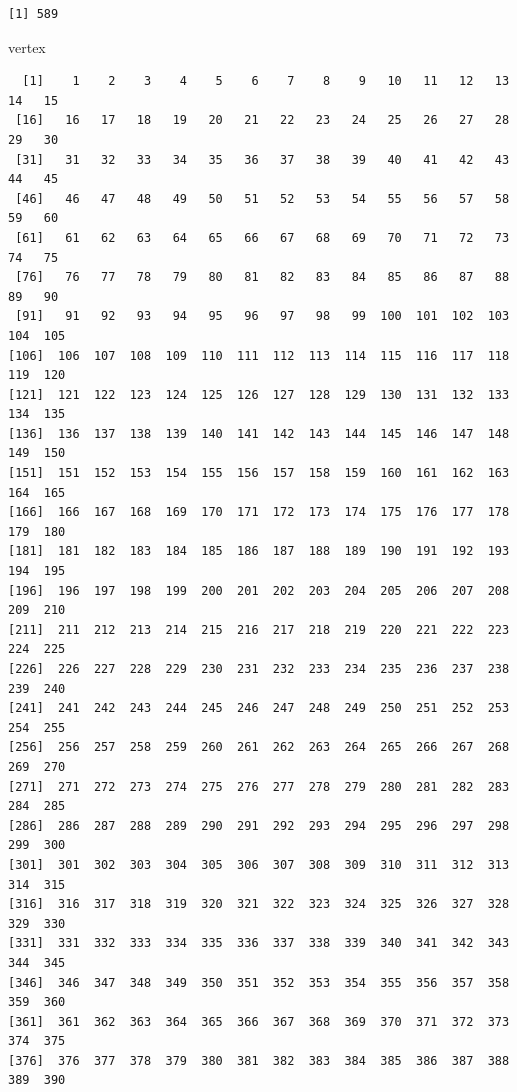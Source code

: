 \documentclass[
  letterpaper,
  DIV=11,
  numbers=noendperiod]{scrreprt}
\newenvironment{Shaded}{\begin{snugshade}}{\end{snugshade}}
\newcommand{\NormalTok}[1]{\textcolor[rgb]{0.00,0.23,0.31}{#1}}
\begin{document}
\begin{verbatim}
[1] 589
\end{verbatim}

\begin{Shaded}
\begin{Highlighting}[]
\NormalTok{vertex}
\end{Highlighting}
\end{Shaded}

\begin{verbatim}
  [1]    1    2    3    4    5    6    7    8    9   10   11   12   13   14   15
 [16]   16   17   18   19   20   21   22   23   24   25   26   27   28   29   30
 [31]   31   32   33   34   35   36   37   38   39   40   41   42   43   44   45
 [46]   46   47   48   49   50   51   52   53   54   55   56   57   58   59   60
 [61]   61   62   63   64   65   66   67   68   69   70   71   72   73   74   75
 [76]   76   77   78   79   80   81   82   83   84   85   86   87   88   89   90
 [91]   91   92   93   94   95   96   97   98   99  100  101  102  103  104  105
[106]  106  107  108  109  110  111  112  113  114  115  116  117  118  119  120
[121]  121  122  123  124  125  126  127  128  129  130  131  132  133  134  135
[136]  136  137  138  139  140  141  142  143  144  145  146  147  148  149  150
[151]  151  152  153  154  155  156  157  158  159  160  161  162  163  164  165
[166]  166  167  168  169  170  171  172  173  174  175  176  177  178  179  180
[181]  181  182  183  184  185  186  187  188  189  190  191  192  193  194  195
[196]  196  197  198  199  200  201  202  203  204  205  206  207  208  209  210
[211]  211  212  213  214  215  216  217  218  219  220  221  222  223  224  225
[226]  226  227  228  229  230  231  232  233  234  235  236  237  238  239  240
[241]  241  242  243  244  245  246  247  248  249  250  251  252  253  254  255
[256]  256  257  258  259  260  261  262  263  264  265  266  267  268  269  270
[271]  271  272  273  274  275  276  277  278  279  280  281  282  283  284  285
[286]  286  287  288  289  290  291  292  293  294  295  296  297  298  299  300
[301]  301  302  303  304  305  306  307  308  309  310  311  312  313  314  315
[316]  316  317  318  319  320  321  322  323  324  325  326  327  328  329  330
[331]  331  332  333  334  335  336  337  338  339  340  341  342  343  344  345
[346]  346  347  348  349  350  351  352  353  354  355  356  357  358  359  360
[361]  361  362  363  364  365  366  367  368  369  370  371  372  373  374  375
[376]  376  377  378  379  380  381  382  383  384  385  386  387  388  389  390

\end{verbatim}
\end{document}
